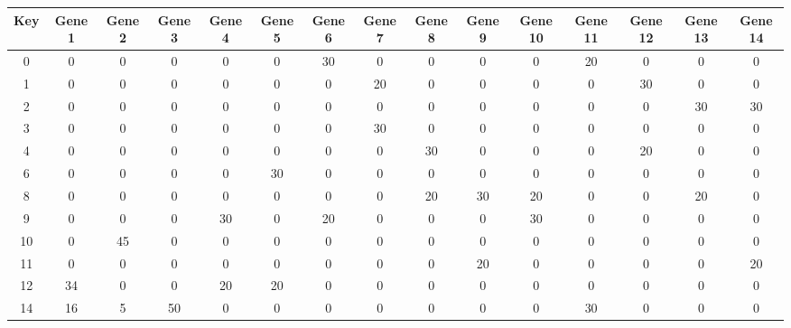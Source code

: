 \begin{tabular}{|c|c|c|c|c|c|c|c|c|c|c|c|c|c|c|}
\hline
Key & Gene 1 & Gene 2 & Gene 3 & Gene 4 & Gene 5 & Gene 6 & Gene 7 & Gene 8 & Gene 9 & Gene 10 & Gene 11 & Gene 12 & Gene 13 & Gene 14 \\
\hline
0 & 0 & 0 & 0 & 0 & 0 & 30 & 0 & 0 & 0 & 0 & 20 & 0 & 0 & 0 \\
1 & 0 & 0 & 0 & 0 & 0 & 0 & 20 & 0 & 0 & 0 & 0 & 30 & 0 & 0 \\
2 & 0 & 0 & 0 & 0 & 0 & 0 & 0 & 0 & 0 & 0 & 0 & 0 & 30 & 30 \\
3 & 0 & 0 & 0 & 0 & 0 & 0 & 30 & 0 & 0 & 0 & 0 & 0 & 0 & 0 \\
4 & 0 & 0 & 0 & 0 & 0 & 0 & 0 & 30 & 0 & 0 & 0 & 20 & 0 & 0 \\
6 & 0 & 0 & 0 & 0 & 30 & 0 & 0 & 0 & 0 & 0 & 0 & 0 & 0 & 0 \\
8 & 0 & 0 & 0 & 0 & 0 & 0 & 0 & 20 & 30 & 20 & 0 & 0 & 20 & 0 \\
9 & 0 & 0 & 0 & 30 & 0 & 20 & 0 & 0 & 0 & 30 & 0 & 0 & 0 & 0 \\
10 & 0 & 45 & 0 & 0 & 0 & 0 & 0 & 0 & 0 & 0 & 0 & 0 & 0 & 0 \\
11 & 0 & 0 & 0 & 0 & 0 & 0 & 0 & 0 & 20 & 0 & 0 & 0 & 0 & 20 \\
12 & 34 & 0 & 0 & 20 & 20 & 0 & 0 & 0 & 0 & 0 & 0 & 0 & 0 & 0 \\
14 & 16 & 5 & 50 & 0 & 0 & 0 & 0 & 0 & 0 & 0 & 30 & 0 & 0 & 0 \\
\hline
\end{tabular}